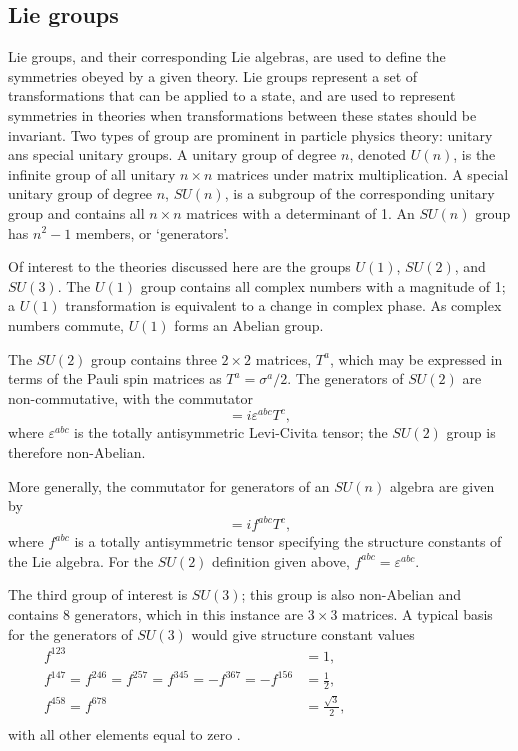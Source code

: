 
\subsection{Lie groups}

Lie groups, and their corresponding Lie algebras, are used to define the
symmetries obeyed by a given theory. Lie groups represent a set of
transformations that can be applied to a state, and are used to represent
symmetries in theories when transformations between these states should be
invariant.  Two types of group are prominent in particle physics theory: unitary
ans special unitary groups.  A unitary group of degree $n$, denoted $U(n)$, is
the infinite group of all unitary $n\times n$ matrices under matrix
multiplication.  A special unitary group of degree $n$, $SU(n)$, is a subgroup
of the corresponding unitary group and contains all $n\times n$ matrices with a
determinant of 1. An $SU(n)$ group has $n^2-1$ members, or `generators'.

Of interest to the theories discussed here are the groups $U(1)$, $SU(2)$, and
$SU(3)$. The $U(1)$ group contains all complex numbers with a magnitude of 1; a
$U(1)$ transformation is equivalent to a change in complex phase. As complex
numbers commute, $U(1)$ forms an Abelian group.

The $SU(2)$ group contains three $2\times 2$ matrices, $T^a$, which may be
expressed in terms of the Pauli spin matrices as $T^a = \sigma^a/2$. The
generators of $SU(2)$ are non-commutative, with the commutator
\begin{equation*}
  [T^a,T^b] = i \varepsilon^{abc} T^c,
\end{equation*}
where $\varepsilon^{abc}$ is the totally antisymmetric Levi-Civita tensor;
the $SU(2)$ group is therefore non-Abelian.

More generally, the commutator for generators of an $SU(n)$ algebra are given by
\begin{equation}
  [T^a,T^b] = if^{abc}T^{c},
  \label{eqn:theory-symmetry-gen-commutator}
\end{equation}
where $f^{abc}$ is a totally antisymmetric tensor specifying the structure
constants of the Lie algebra. For the $SU(2)$ definition given above,
$f^{abc}=\varepsilon^{abc}$.

The third group of interest is $SU(3)$; this group is also non-Abelian and
contains 8 generators, which in this instance are $3\times 3$ matrices. A
typical basis for the generators of $SU(3)$ would give structure constant values
\begin{equation*}
  \begin{split}
    f^{123} &= 1, \\
    f^{147} = f^{246} = f^{257} = f^{345} = -f^{367} = -f^{156} &= \frac12,
    \hspace{10em}\\
    f^{458} = f^{678} &= \frac{\sqrt{3}}2, \\
  \end{split}
\end{equation*}
%
with all other elements equal to zero \cite{gellmann1961}.

